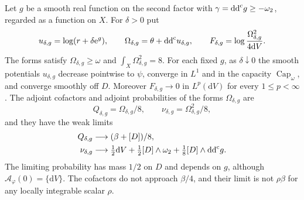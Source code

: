 \begin{theorem}\label{thm:divisorial-smoothing-adjoints}
Let $g$ be a smooth real function on the second factor with $\gamma=\mathrm{dd}^{\mathrm{c}} g\geq-\omega_2$, regarded as a function on $X$. For $\delta>0$ put
\[
 u_{\delta,g}=\log(r+\delta\mathrm e^g),\qquad
 \Omega_{\delta,g}=\theta+\mathrm{dd}^{\mathrm{c}} u_{\delta,g},\qquad
 F_{\delta,g}=\log\frac{\Omega_{\delta,g}^2}{4\mathrm dV}.
\]
The forms satisfy $\Omega_{\delta,g}\geq\omega$ and $\int_X\Omega_{\delta,g}^2=8$. For each fixed $g$, as $\delta\downarrow0$ the smooth potentials $u_{\delta,g}$ decrease pointwise to $\psi$, converge in $L^1$ and in the capacity $\operatorname{Cap}_\omega$, and converge smoothly off $D$. Moreover $F_{\delta,g}\to0$ in $L^p(\mathrm dV)$ for every $1\leq p<\infty$. The adjoint cofactors and adjoint probabilities of the forms $\Omega_{\delta,g}$ are
\[
 Q_{\delta,g}=\Omega_{\delta,g}/8,\qquad
 \nu_{\delta,g}=\Omega_{\delta,g}^2/8,
\]
and they have the weak limits
\begin{equation}\label{eq:divisorial-adjoint-limits}
 \begin{split}
 Q_{\delta,g}&\longrightarrow(\beta+[D])/8,\\
 \nu_{\delta,g}&\longrightarrow
 \tfrac12\mathrm dV+\tfrac12[D]\wedge\omega_2
                  +\tfrac18[D]\wedge\mathrm{dd}^{\mathrm{c}} g.
 \end{split}
\end{equation}
The limiting probability has mass $1/2$ on $D$ and depends on $g$, although $\mathcal A_\varphi(0)=\{\mathrm dV\}$. The cofactors do not approach $\beta/4$, and their limit is not $\rho\beta$ for any locally integrable scalar $\rho$.
\end{theorem}
